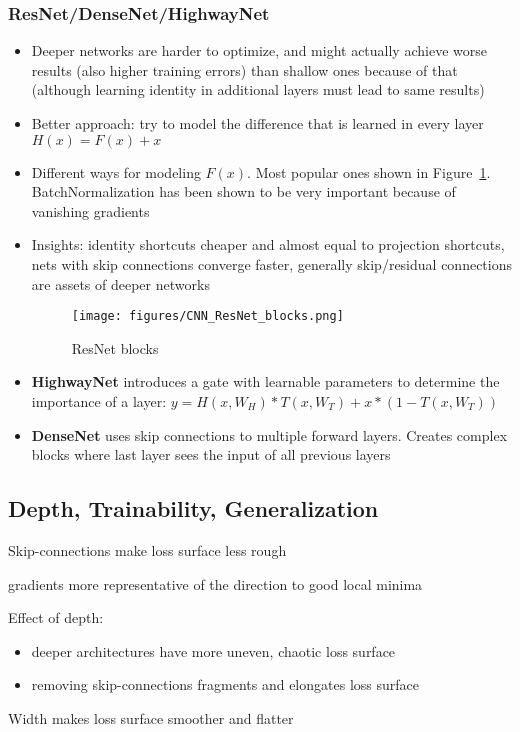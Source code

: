 \subsubsection{ResNet/DenseNet/HighwayNet}
\begin{itemize}
	\item Deeper networks are harder to optimize, and might actually achieve worse results (also higher training errors) than shallow ones because of that (although learning identity in additional layers must lead to same results)
	\item Better approach: try to model the difference that is learned in every layer $H(x) = F(x) + x$
	\item Different ways for modeling $F(x)$. Most popular ones shown in Figure~\ref{fig:CNN_ResNet_blocks}. BatchNormalization has been shown to be very important because of vanishing gradients
	\item Insights: identity shortcuts cheaper and almost equal to projection shortcuts, nets with skip connections converge faster, generally skip/residual connections are assets of deeper networks
	\begin{figure}[ht!]
		\centering
		\texttt{[image: figures/CNN\_ResNet\_blocks.png]}
		\caption{ResNet blocks}
		\label{fig:CNN_ResNet_blocks}
	\end{figure}
	\item \textbf{HighwayNet} introduces a gate with learnable parameters to determine the importance of a layer: $y = H(x, W_H) * T(x, W_T) + x * (1 - T(x, W_T))$
	\item \textbf{DenseNet} uses skip connections to multiple forward layers. Creates complex blocks where last layer sees the input of all previous layers
\end{itemize}
\subsection{Depth, Trainability, Generalization}
\item Skip-connections make loss surface less rough
\item gradients more representative of the direction to good local minima
\item Effect of depth:
\begin{itemize}
	\item deeper architectures have more uneven, chaotic loss surface
	\item removing skip-connections fragments and elongates loss surface
\end{itemize}
\item Width makes loss surface smoother and flatter
